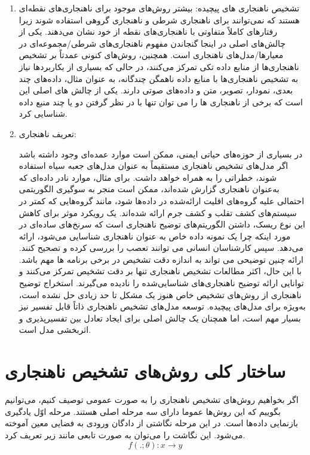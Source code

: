 \documentclass[12pt,a4paper]{report}
\theoremstyle{definition}
\theoremstyle{definition}
\begin{document}
\begin{enumerate}
{}

\item{
تشخیص ناهنجاری های پیچیده:
بیشتر روش‌های موجود برای ناهنجاری‌های نقطه‌ای هستند که نمی‌توانند برای ناهنجاری شرطی و ناهنجاری گروهی استفاده شوند زیرا رفتارهای کاملاً متفاوتی با ناهنجاری‌های نقطه از خود نشان می‌دهند. یکی از چالش‌های اصلی در اینجا گنجاندن مفهوم ناهنجاری‌های شرطی/مجموعه‌ای در معیارها/مدل‌های ناهنجاری است. همچنین، روش‌های کنونی عمدتاً بر تشخیص ناهنجاری‌ها از منابع داده تکی تمرکز می‌کنند، در حالی که بسیاری از بکاربردها
 نیاز به تشخیص ناهنجاری‌ها با منابع داده ناهمگن چندگانه، به عنوان مثال، داده‌های چند بعدی، نمودار، تصویر، متن و داده‌های صوتی دارند. یکی از چالش های اصلی این است که برخی از ناهنجاری ها را می توان تنها با در نظر گرفتن دو یا چند منبع داده شناسایی کرد.
}

\item {
تعریف ناهنجاری:

در بسیاری از حوزه‌های حیاتی ایمنی، ممکن است موارد عمده‌ای وجود داشته باشد اگر مدل‌های تشخیص ناهنجاری مستقیماً به عنوان مدل‌های جعبه سیاه استفاده شوند، خطراتی را به همراه خواهد داشت. برای مثال، موارد نادر داده‌ای که به‌عنوان ناهنجاری گزارش شده‌اند، ممکن است منجر به سوگیری الگوریتمی احتمالی علیه گروه‌های اقلیت ارائه‌شده در داده‌ها شود، مانند گروه‌هایی که کمتر در سیستم‌های کشف تقلب و کشف جرم ارائه شده‌اند. یک رویکرد موثر برای کاهش این نوع ریسک، داشتن الگوریتم‌های توضیح ناهنجاری است که سرنخ‌های ساده‌ای در مورد اینکه چرا یک نمونه داده خاص به عنوان ناهنجاری شناسایی می‌شود، ارائه می‌دهد. سپس کارشناسان انسانی می توانند تعصب را بررسی کرده و تصحیح کنند. ارائه چنین توضیحی می تواند به اندازه دقت تشخیص در برخی برنامه ها مهم باشد. با این حال، اکثر مطالعات تشخیص ناهنجاری تنها بر دقت تشخیص تمرکز می‌کنند و توانایی ارائه توضیح ناهنجاری‌های شناسایی‌شده را نادیده می‌گیرند. استخراج توضیح ناهنجاری از روش‌های تشخیص خاص هنوز یک مشکل تا حد زیادی حل نشده است، به‌ویژه برای مدل‌های پیچیده. توسعه مدل‌های تشخیص ناهنجاری ذاتاً قابل تفسیر نیز بسیار مهم است، اما همچنان یک چالش اصلی برای ایجاد تعادل بین تفسیرپذیری و اثربخشی مدل است.
}
\end{enumerate}
\section{ساختار کلی روش‌های تشخیص ناهنجاری}

	اگر بخواهیم روش‌های تشخیص ناهنجاری را به صورت عمومی توصیف کنیم، می‌توانیم بگوییم که این روش‌ها عموما دارای سه مرحله اصلی هستند. مرحله اوّل یادگیری بازنمایی داد‌ه‌ها است. در این مرحله نگاشتی از دادگان ورودی به فضایی معین آموخته می‌شود. این نگاشت را می‌توان به صورت تابعی مانند زیر تعریف کرد.
\begin{equation}
f(.;\theta): x \rightarrow y
\end{equation}
	
\end{document}
